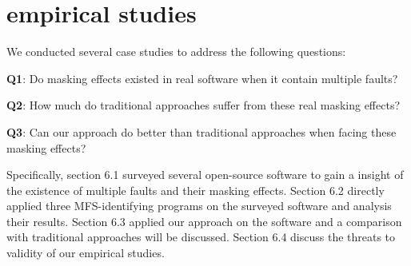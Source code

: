 \documentclass{sig-alternate}
\begin{document}
%
%

\section{empirical studies}
We conducted several case studies to address the following questions:

\textbf{Q1}: Do masking effects existed in real software when it contain multiple faults?

\textbf{Q2}: How much do traditional approaches suffer from these real masking effects?

\textbf{Q3}: Can our approach do better than traditional approaches when facing these masking effects?

Specifically, section 6.1 surveyed several open-source software to gain a insight of the existence of multiple faults and their masking effects. Section 6.2 directly applied three MFS-identifying programs on the surveyed software and analysis their results. Section 6.3 applied our approach on the software and a comparison with traditional approaches will be discussed. Section 6.4 discuss the threats to validity of our empirical studies.
\end{document}

